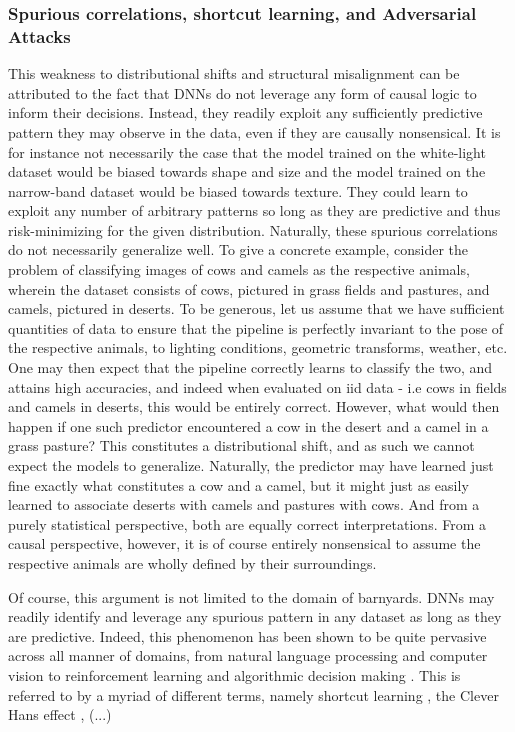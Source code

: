 		\subsubsection{Spurious correlations, shortcut learning, and Adversarial Attacks}
		This weakness to distributional shifts and structural misalignment can be attributed to the fact that DNNs do not leverage any form of causal logic to inform their decisions. Instead, they readily exploit any sufficiently predictive pattern they may observe in the data, even if they are causally nonsensical. It is for instance not necessarily the case that the model trained on the white-light dataset would be biased towards shape and size and the model trained on the narrow-band dataset would be biased towards texture. They could learn to exploit any number of arbitrary patterns so long as they are predictive and thus risk-minimizing for the given distribution. Naturally, these spurious correlations do not necessarily generalize well. To give a concrete example, consider the problem of classifying images of cows and camels as the respective animals, wherein the dataset consists of cows, pictured in grass fields and pastures, and camels, pictured in deserts. To be generous, let us assume that we have sufficient quantities of data to ensure that the pipeline is perfectly invariant to the pose of the respective animals, to lighting conditions, geometric transforms, weather, etc. One may then expect that the pipeline correctly learns to classify the two, and attains high accuracies, and indeed when evaluated on iid data - i.e cows in fields and camels in deserts, this would be entirely correct. However, what would then happen if one such predictor encountered a cow in the desert and a camel in a grass pasture? This constitutes a distributional shift, and as such we cannot expect the models to generalize. Naturally, the predictor may have learned just fine exactly what constitutes a cow and a camel, but it might just as easily learned to associate deserts with camels and pastures with cows. And from a purely statistical perspective, both are equally correct interpretations. From a causal perspective, however, it is of course entirely nonsensical to assume the respective animals are wholly defined by their surroundings.

		Of course, this argument is not limited to the domain of barnyards. DNNs may readily identify and leverage any spurious pattern in any dataset as long as they are predictive. Indeed, this phenomenon has been shown to be quite pervasive across all manner of domains, from natural language processing and computer vision to reinforcement learning and algorithmic decision making \cite{shortcut_learning}. This is referred to by a myriad of different terms, namely shortcut learning \cite{shortcut_learning}, the Clever Hans effect \cite{clever_hans}, (...)

